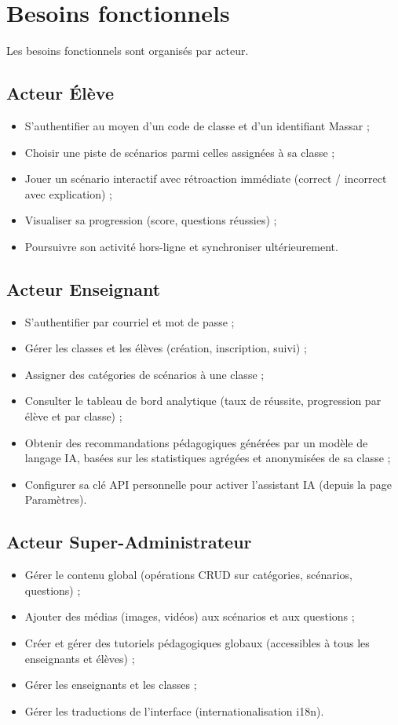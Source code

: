 \documentclass[12pt, a4paper, oneside]{report}
\begin{document}
\section{Besoins fonctionnels}
Les besoins fonctionnels sont organisés par acteur.

\subsection{Acteur Élève}
\begin{itemize}[leftmargin=*]
  \item S'authentifier au moyen d'un code de classe et d'un identifiant Massar ;
  \item Choisir une piste de scénarios parmi celles assignées à sa classe ;
  \item Jouer un scénario interactif avec rétroaction immédiate (correct / incorrect avec explication) ;
  \item Visualiser sa progression (score, questions réussies) ;
  \item Poursuivre son activité hors-ligne et synchroniser ultérieurement.
\end{itemize}

\subsection{Acteur Enseignant}
\begin{itemize}[leftmargin=*]
  \item S'authentifier par courriel et mot de passe ;
  \item Gérer les classes et les élèves (création, inscription, suivi) ;
  \item Assigner des catégories de scénarios à une classe ;
  \item Consulter le tableau de bord analytique (taux de réussite, progression par élève et par classe) ;
  \item Obtenir des recommandations pédagogiques générées par un modèle de langage IA, basées sur les statistiques agrégées et anonymisées de sa classe ;
  \item Configurer sa clé API personnelle pour activer l'assistant IA (depuis la page Paramètres).
\end{itemize}

\subsection{Acteur Super-Administrateur}
\begin{itemize}[leftmargin=*]
  \item Gérer le contenu global (opérations CRUD sur catégories, scénarios, questions) ;
  \item Ajouter des médias (images, vidéos) aux scénarios et aux questions ;
  \item Créer et gérer des tutoriels pédagogiques globaux (accessibles à tous les enseignants et élèves) ;
  \item Gérer les enseignants et les classes ;
  \item Gérer les traductions de l'interface (internationalisation i18n).
\end{itemize}
\end{document}
